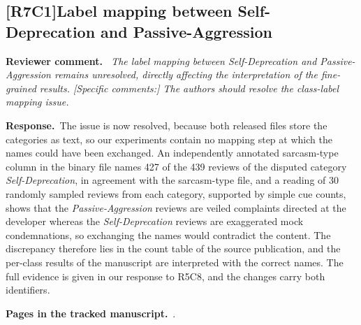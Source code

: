 \documentclass[11pt,a4paper]{article}
\newcommand{\comment}[3]{\subsection*{\textcolor{#1}{[#2]}\enspace #3}}
\newenvironment{reviewercomment}{\par\noindent\textbf{Reviewer comment.}\itshape\ }{\par}
\newcommand{\response}{\par\noindent\textbf{Response.}\ }
\newcommand{\where}[1]{\par\noindent\textbf{Pages in the tracked manuscript.}\ \rvpages[M-]{#1}.}
\begin{document}
\comment{rvBoth}{R7C1}{Label mapping between Self-Deprecation and Passive-Aggression}
\begin{reviewercomment}
The label mapping between Self-Deprecation and Passive-Aggression remains unresolved, directly affecting the interpretation of the fine-grained results. [Specific comments:] The authors should resolve the class-label mapping issue.
\end{reviewercomment}
\response The issue is now resolved, because both released files store the categories as text, so our experiments contain no mapping step at which the names could have been exchanged. An independently annotated sarcasm-type column in the binary file names 427 of the 439 reviews of the disputed category \textit{Self-Deprecation}, in agreement with the sarcasm-type file, and a reading of 30 randomly sampled reviews from each category, supported by simple cue counts, shows that the \textit{Passive-Aggression} reviews are veiled complaints directed at the developer whereas the \textit{Self-Deprecation} reviews are exaggerated mock condemnations, so exchanging the names would contradict the content. The discrepancy therefore lies in the count table of the source publication, and the per-class results of the manuscript are interpreted with the correct names. The full evidence is given in our response to R5C8, and the changes carry both identifiers.

\where{R7C1}
\end{document}
